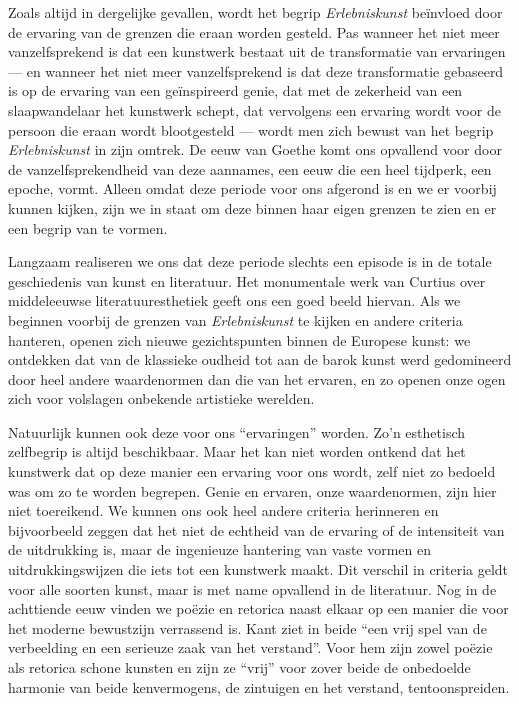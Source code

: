 Zoals altijd in dergelijke gevallen, wordt het begrip \textit{Erlebniskunst} beïnvloed door de ervaring van de grenzen die eraan worden gesteld. Pas wanneer het niet meer vanzelfsprekend is dat een kunstwerk bestaat uit de transformatie van ervaringen — en wanneer het niet meer vanzelfsprekend is dat deze transformatie gebaseerd is op de ervaring van een geïnspireerd genie, dat met de zekerheid van een slaapwandelaar het kunstwerk schept, dat vervolgens een ervaring wordt voor de persoon die eraan wordt blootgesteld — wordt men zich bewust van het begrip \textit{Erlebniskunst} in zijn omtrek. De eeuw van Goethe komt ons opvallend voor door de vanzelfsprekendheid van deze aannames, een eeuw die een heel tijdperk, een epoche, vormt. Alleen omdat deze periode voor ons afgerond is en we er voorbij kunnen kijken, zijn we in staat om deze binnen haar eigen grenzen te zien en er een begrip van te vormen.

Langzaam realiseren we ons dat deze periode slechts een episode is in de totale geschiedenis van kunst en literatuur. Het monumentale werk van Curtius over middeleeuwse literatuuresthetiek geeft ons een goed beeld hiervan. Als we beginnen voorbij de grenzen van \textit{Erlebniskunst} te kijken en andere criteria hanteren, openen zich nieuwe gezichtspunten binnen de Europese kunst: we ontdekken dat van de klassieke oudheid tot aan de barok kunst werd gedomineerd door heel andere waardenormen dan die van het ervaren, en zo openen onze ogen zich voor volslagen onbekende artistieke werelden.

Natuurlijk kunnen ook deze voor ons ``ervaringen'' worden. Zo’n esthetisch zelfbegrip is altijd beschikbaar. Maar het kan niet worden ontkend dat het kunstwerk dat op deze manier een ervaring voor ons wordt, zelf niet zo bedoeld was om zo te worden begrepen. Genie en ervaren, onze waardenormen, zijn hier niet toereikend. We kunnen ons ook heel andere criteria herinneren en bijvoorbeeld zeggen dat het niet de echtheid van de ervaring of de intensiteit van de uitdrukking is, maar de ingenieuze hantering van vaste vormen en uitdrukkingswijzen die iets tot een kunstwerk maakt. Dit verschil in criteria geldt voor alle soorten kunst, maar is met name opvallend in de literatuur. Nog in de achttiende eeuw vinden we poëzie en retorica naast elkaar op een manier die voor het moderne bewustzijn verrassend is. Kant ziet in beide ``een vrij spel van de verbeelding en een serieuze zaak van het verstand''. Voor hem zijn zowel poëzie als retorica schone kunsten en zijn ze ``vrij'' voor zover beide de onbedoelde harmonie van beide kenvermogens, de zintuigen en het verstand, tentoonspreiden.

